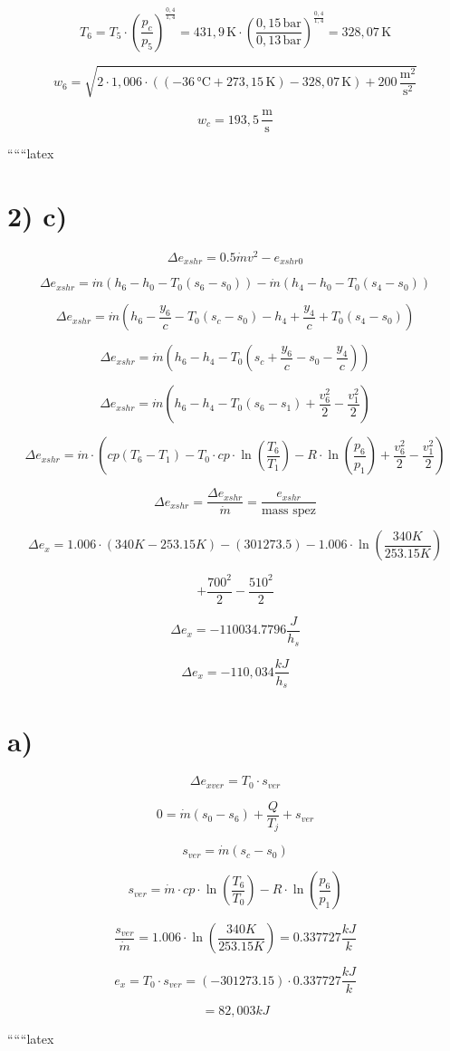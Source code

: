 \[
T_6 = T_5 \cdot \left( \frac{p_c}{p_5} \right)^{\frac{0,4}{1,4}} = 431,9 \, \text{K} \cdot \left( \frac{0,15 \, \text{bar}}{0,13 \, \text{bar}} \right)^{\frac{0,4}{1,4}} = 328,07 \, \text{K}
\]

\[
w_6 = \sqrt{2 \cdot 1,006 \cdot \left( (-36 \, \text{°C} + 273,15 \, \text{K}) - 328,07 \, \text{K} \right) + 200 \, \frac{\text{m}^2}{\text{s}^2}}
\]

\[
w_c = 193,5 \, \frac{\text{m}}{\text{s}}
\]

``````latex

\section*{2) c)}

\[
\Delta e_{xshr} = 0.5 \dot{m} v^2 - e_{xshr0}
\]

\[
\Delta e_{xshr} = \dot{m} (h_6 - h_0 - T_0 (s_6 - s_0)) - \dot{m} (h_4 - h_0 - T_0 (s_4 - s_0))
\]

\[
\Delta e_{xshr} = \dot{m} (h_6 - \frac{y_6}{c} - T_0 (s_c - s_0) - h_4 + \frac{y_4}{c} + T_0 (s_4 - s_0))
\]

\[
\Delta e_{xshr} = \dot{m} (h_6 - h_4 - T_0 (s_c + \frac{y_6}{c} - s_0 - \frac{y_4}{c}))
\]

\[
\Delta e_{xshr} = \dot{m} (h_6 - h_4 - T_0 (s_6 - s_1) + \frac{v_6^2}{2} - \frac{v_1^2}{2})
\]

\[
\Delta e_{xshr} = \dot{m} \cdot (cp (T_6 - T_1) - T_0 \cdot cp \cdot \ln \left( \frac{T_6}{T_1} \right) - R \cdot \ln \left( \frac{p_6}{p_1} \right) + \frac{v_6^2}{2} - \frac{v_1^2}{2})
\]

\[
\Delta e_{xshr} = \frac{\Delta e_{xshr}}{\dot{m}} = \frac{e_{xshr}}{\text{mass spez}}
\]

\[
\Delta e_x = 1.006 \cdot (340K - 253.15K) - (301273.5) - 1.006 \cdot \ln \left( \frac{340K}{253.15K} \right)
\]

\[
+ \frac{700^2}{2} - \frac{510^2}{2}
\]

\[
\Delta e_x = -110034.7796 \frac{J}{h_s}
\]

\[
\Delta e_x = -110,034 \frac{kJ}{h_s}
\]

\section*{a)}

\[
\Delta e_{xver} = T_0 \cdot s_{ver}
\]

\[
0 = \dot{m} (s_0 - s_6) + \frac{Q}{T_j} + s_{ver}
\]

\[
s_{ver} = \dot{m} (s_c - s_0)
\]

\[
s_{ver} = \dot{m} \cdot cp \cdot \ln \left( \frac{T_6}{T_0} \right) - R \cdot \ln \left( \frac{p_6}{p_1} \right)
\]

\[
\frac{s_{ver}}{\dot{m}} = 1.006 \cdot \ln \left( \frac{340K}{253.15K} \right) = 0.337727 \frac{kJ}{k}
\]

\[
e_x = T_0 \cdot s_{ver} = (-301273.15) \cdot 0.337727 \frac{kJ}{k}
\]

\[
= 82,003 kJ
\]

``````latex



